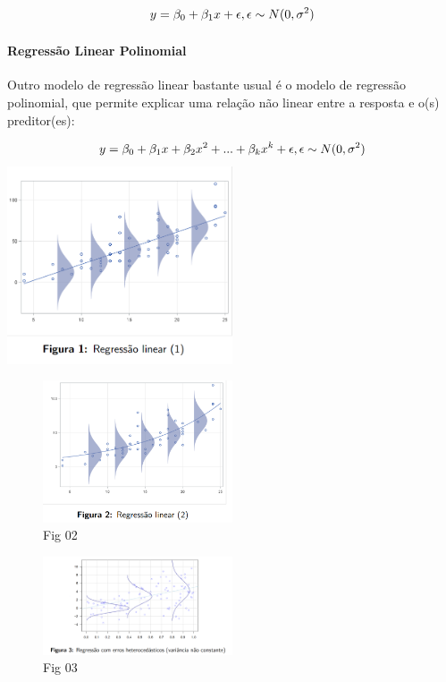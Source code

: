 \documentclass[
]{article}
\begin{document}
\[
y = \beta_0 + \beta_1 x + \epsilon,
\space \space \space \space \space 
\epsilon \sim N (0, \sigma^2)
\]

\paragraph{Regressão Linear
Polinomial}\label{regressuxe3o-linear-polinomial}

Outro modelo de regressão linear bastante usual é o modelo de regressão
polinomial, que permite explicar uma relação não linear entre a resposta
e o(s) preditor(es):

\[
y = \beta_0 + \beta_1 x + \beta_2 x^2 + ... + \beta_k x^k + \epsilon,
\space \space \space \space \space 
\epsilon \sim N (0, \sigma^2)
\]
\includegraphics[width=0.5\textwidth,height=\textheight]{2024-08-10-fig1.png}

\begin{figure}
\centering
\includegraphics[width=0.5\textwidth,height=\textheight]{2024-08-10-fig2.png}
\caption{Fig 02}
\end{figure}

\begin{figure}
\centering
\includegraphics[width=0.5\textwidth,height=\textheight]{2024-08-10-fig3.png}
\caption{Fig 03}
\end{figure}
\end{document}

